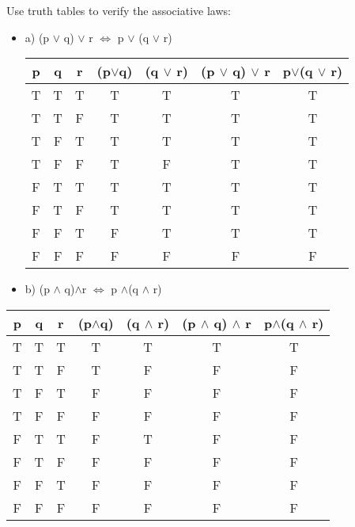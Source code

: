 \documentclass[11pt]{article}
\begin{document}
Use truth tables to verify the associative laws:
\begin{itemize}
	\item [] a)
	(p $\vee$ q) $\vee$ r $\Leftrightarrow$ p $\vee$ (q $\vee$ r)\\
	
		\begin{center}
			\begin{tabular}{||c | c | c | c | c | c | c||}					\hline
				p & q & r & (p$\vee$q) & (q $\vee$ r) & (p $\vee$ q) $\vee$ r & p$\vee$(q $\vee$ r)\\	
				\hline
				T & T & T & T & T & T & T\\
				\hline
				T & T & F & T & T & T & T\\
				\hline
				T & F & T & T & T & T & T\\
				\hline
				T & F & F & T & F & T & T\\
				\hline			
				F & T & T & T & T & T & T\\
				\hline
				F & T & F & T & T & T & T\\
				\hline	
				F & F & T & F & T & T & T\\
				\hline
				F & F & F & F & F & F & F\\
				\hline
	
				\end{tabular}
			\end{center}
			
	\item [] b)
	(p $\wedge$ q)$\wedge$r $\Leftrightarrow$ p $\wedge$(q $\wedge$ r)\\
	
\end{itemize}
			\begin{center}
				\begin{tabular}{||c | c | c | c | c | c | c||}					\hline
					p & q & r & (p$\wedge$q) & (q $\wedge$ r) & (p $\wedge$ q) $\wedge$ r & p$\wedge$(q $\wedge$ r)\\	
					\hline
					T & T & T & T & T & T & T\\
					\hline
					T & T & F & T & F & F & F\\
					\hline
					T & F & T & F & F & F & F\\
					\hline
					T & F & F & F & F & F & F\\
					\hline			
					F & T & T & F & T & F & F\\
					\hline
					F & T & F & F & F & F & F\\
					\hline	
					F & F & T & F & F & F & F\\
					\hline
					F & F & F & F & F & F & F\\
					\hline
					
				\end{tabular}
			\end{center}
\end{document}
